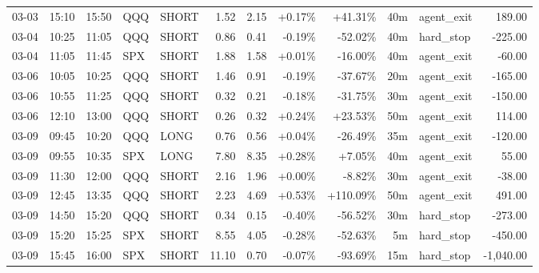 \documentclass[11pt,a4paper,twoside]{article}
\begin{document}
\begin{center}
\begin{longtable}{>{\color{txtmain}}l l l l l r r r r r >{\color{txtmain}}l r}
03-03 & 15:10 & 15:50 & QQQ & SHORT & 1.52 & 2.15 & \textcolor{wingreen}{+0.17\%} & \textcolor{wingreen}{+41.31\%} & 40m & agent\_exit & \textcolor{wingreen}{189.00} \\
03-04 & 10:25 & 11:05 & QQQ & SHORT & 0.86 & 0.41 & \textcolor{lossred}{-0.19\%} & \textcolor{lossred}{-52.02\%} & 40m & hard\_stop & \textcolor{lossred}{-225.00} \\
03-04 & 11:05 & 11:45 & SPX & SHORT & 1.88 & 1.58 & \textcolor{wingreen}{+0.01\%} & \textcolor{lossred}{-16.00\%} & 40m & agent\_exit & \textcolor{lossred}{-60.00} \\
03-06 & 10:05 & 10:25 & QQQ & SHORT & 1.46 & 0.91 & \textcolor{lossred}{-0.19\%} & \textcolor{lossred}{-37.67\%} & 20m & agent\_exit & \textcolor{lossred}{-165.00} \\
03-06 & 10:55 & 11:25 & QQQ & SHORT & 0.32 & 0.21 & \textcolor{lossred}{-0.18\%} & \textcolor{lossred}{-31.75\%} & 30m & agent\_exit & \textcolor{lossred}{-150.00} \\
03-06 & 12:10 & 13:00 & QQQ & SHORT & 0.26 & 0.32 & \textcolor{wingreen}{+0.24\%} & \textcolor{wingreen}{+23.53\%} & 50m & agent\_exit & \textcolor{wingreen}{114.00} \\
03-09 & 09:45 & 10:20 & QQQ & LONG & 0.76 & 0.56 & \textcolor{wingreen}{+0.04\%} & \textcolor{lossred}{-26.49\%} & 35m & agent\_exit & \textcolor{lossred}{-120.00} \\
03-09 & 09:55 & 10:35 & SPX & LONG & 7.80 & 8.35 & \textcolor{wingreen}{+0.28\%} & \textcolor{wingreen}{+7.05\%} & 40m & agent\_exit & \textcolor{wingreen}{55.00} \\
03-09 & 11:30 & 12:00 & QQQ & SHORT & 2.16 & 1.96 & \textcolor{wingreen}{+0.00\%} & \textcolor{lossred}{-8.82\%} & 30m & agent\_exit & \textcolor{lossred}{-38.00} \\
03-09 & 12:45 & 13:35 & QQQ & SHORT & 2.23 & 4.69 & \textcolor{wingreen}{+0.53\%} & \textcolor{wingreen}{+110.09\%} & 50m & agent\_exit & \textcolor{wingreen}{491.00} \\
03-09 & 14:50 & 15:20 & QQQ & SHORT & 0.34 & 0.15 & \textcolor{lossred}{-0.40\%} & \textcolor{lossred}{-56.52\%} & 30m & hard\_stop & \textcolor{lossred}{-273.00} \\
03-09 & 15:20 & 15:25 & SPX & SHORT & 8.55 & 4.05 & \textcolor{lossred}{-0.28\%} & \textcolor{lossred}{-52.63\%} & 5m & hard\_stop & \textcolor{lossred}{-450.00} \\
03-09 & 15:45 & 16:00 & SPX & SHORT & 11.10 & 0.70 & \textcolor{lossred}{-0.07\%} & \textcolor{lossred}{-93.69\%} & 15m & hard\_stop & \textcolor{lossred}{-1,040.00} \\

\end{longtable}
\end{center}
\end{document}
